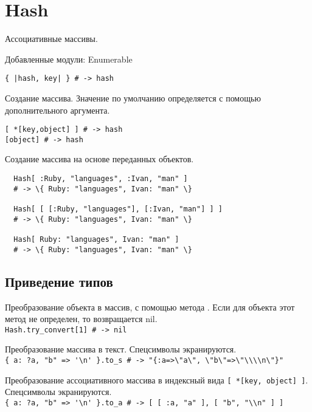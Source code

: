 \section{Hash}

Ассоциативные массивы.

Добавленные модули: Enumerable 

\begin{methodlist}
  \verb!{ |hash, key| } # -> hash!

  Создание массива. Значение по умолчанию определяется с помощью дополнительного аргумента.

  \verb![ *[key,object] ] # -> hash!
  \\\verb![object] # -> hash!

  Создание массива на основе переданных объектов.
  \begin{verbatim}
  Hash[ :Ruby, "languages", :Ivan, "man" ] 
  # -> \{ Ruby: "languages", Ivan: "man" \} 
  
  Hash[ [ [:Ruby, "languages"], [:Ivan, "man"] ] ] 
  # -> \{ Ruby: "languages", Ivan: "man" \} 
  
  Hash[ Ruby: "languages", Ivan: "man" ] 
  # -> \{ Ruby: "languages", Ivan: "man" \}
  \end{verbatim}
\end{methodlist} 

\subsection*{Приведение типов}

\begin{methodlist}
  Преобразование объекта в массив, с помощью метода . Если для объекта этот метод не определен, то возвращается nil. 
  \\\verb!Hash.try_convert[1] # -> nil!
 
  Преобразование массива в текст. Спецсимволы экранируются. 
  \\\verb!{ a: ?a, "b" => '\n' }.to_s # -> "{:a=>\"a\", \"b\"=>\"\\\\n\"}"!

  Преобразование ассоциативного массива в индексный вида \verb![ *[key, object] ]!. Спецсимволы экранируются.
  \\\verb!{ a: ?a, "b" => '\n' }.to_a # -> [ [ :a, "a" ], [ "b", "\\n" ] ]!

\end{methodlist}

